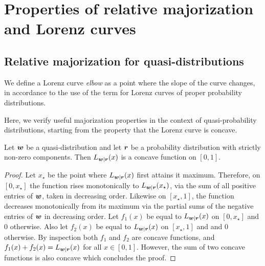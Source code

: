 \documentclass[pra,
aps,
twocolumn,
superscriptaddress,
groupedaddress,
nofootinbib,
reprint
]{revtex4-1}
\begin{document}
\section{Properties of relative majorization and Lorenz curves}
\label{app:major}

\subsection{Relative majorization for quasi-distributions}
\label{app:rel_quasi}

We define a Lorenz curve \emph{elbow} as a point where the slope of the curve changes, in accordance to the use of the term for Lorenz curves of proper probability distributions.

Here, we verify useful majorization properties in the context of quasi-probability distributions, starting from the property that the Lorenz curve is concave.
\begin{proposition}\label{L-concave} 
	Let $\boldsymbol{w}$ be a quasi-distribution and let $\boldsymbol{r}$ be a probability distribution with strictly non-zero components. Then $L_{\boldsymbol{w}|\boldsymbol{r}}(x)$ is a concave function on $[0,1]$.
\end{proposition}
\begin{proof} 
	Let $x_\star$ be the point where $L_{\boldsymbol{w}|\boldsymbol{r}}(x)$ first attains it maximum. Therefore, on $[0,x_\star]$ the function rises monotonically to $L_{\boldsymbol{w}|\boldsymbol{r}}(x_\star)$, via the sum of all positive entries of $\boldsymbol{w}$, taken in decreasing order. Likewise on $[x_\star, 1]$, the function decreases monotonically from its maximum via the partial sums of the negative entries of $\boldsymbol{w}$ in decreasing order. Let $f_1(x)$ be equal to $L_{\boldsymbol{w}|\boldsymbol{r}}(x)$ on $[0, x_\star]$ and $0$ otherwise. Also let $f_2(x)$ be equal to $L_{\boldsymbol{w}|\boldsymbol{r}}(x)$ on $[x_\star,1]$ and and $0$ otherwise. By inspection both $f_1$ and $f_2$ are concave functions, and $f_1(x) + f_2 (x) = L_{\boldsymbol{w}|\boldsymbol{r}}(x)$ for all $x\in [0,1]$. However, the sum of two concave functions is also concave which concludes the proof.
\end{proof}
\end{document}
